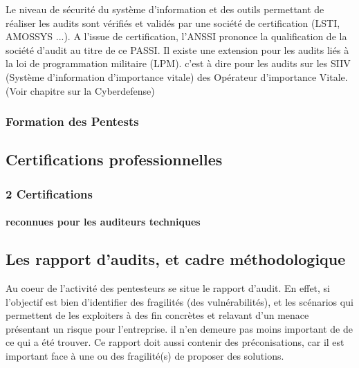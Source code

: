 Le niveau de sécurité du système d'information et des  outils permettant de réaliser les audits sont vérifiés et validés par une société de certification (LSTI, AMOSSYS ...). A l'issue de certification, l'ANSSI prononce la qualification de la société d'audit au titre de ce PASSI. Il existe une extension pour les audits liés à la loi de programmation militaire (LPM). c'est à dire pour les audits sur les SIIV (Système d'information d'importance vitale) des Opérateur d'importance Vitale. (Voir chapitre sur la Cyberdefense)

\subsubsection{Formation des Pentests}

\subsection {Certifications professionnelles}

\begin{frame}
\frametitle<presentation>{2 Certifications}
\framesubtitle<presentation>{reconnues pour les auditeurs techniques}
\end{frame}

\subsection {Les rapport d'audits, et cadre méthodologique}

Au coeur de l'activité  des pentesteurs se situe le rapport d'audit.
En effet, si l'objectif est bien d'identifier des fragilités (des vulnérabilités), et les scénarios qui permettent de les exploiters à des fin concrètes et relavant d'un menace présentant un risque pour l'entreprise.
il n'en demeure pas moins important de  de ce qui a été trouver. Ce rapport doit aussi contenir des préconisations, car il est important face à une ou des fragilité(s) de proposer des solutions. 




